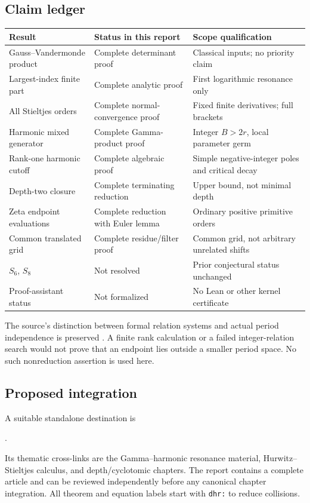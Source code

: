 \documentclass[11pt,letterpaper]{article}
\numberwithin{equation}{section}
\theoremstyle{definition}\newtheorem{definition}[theorem]{Definition}
\theoremstyle{remark}\newtheorem{remark}[theorem]{Remark}
\begin{document}
\subsection{Claim ledger}
\begin{center}
\small
\begin{tabular}{>{\raggedright\arraybackslash}p{}>{\raggedright\arraybackslash}p{}>{\raggedright\arraybackslash}p{}}
\toprule
Result & Status in this report & Scope qualification\\
\midrule
Gauss--Vandermonde product & Complete determinant proof & Classical inputs; no priority claim\\
Largest-index finite part & Complete analytic proof & First logarithmic resonance only\\
All Stieltjes orders & Complete normal-convergence proof & Fixed finite derivatives; full brackets\\
Harmonic mixed generator & Complete Gamma-product proof & Integer $B>2r$, local parameter germ\\
Rank-one harmonic cutoff & Complete algebraic proof & Simple negative-integer poles and critical decay\\
Depth-two closure & Complete terminating reduction & Upper bound, not minimal depth\\
Zeta endpoint evaluations & Complete reduction with Euler lemma & Ordinary positive primitive orders\\
Common translated grid & Complete residue/filter proof & Common grid, not arbitrary unrelated shifts\\
$S_6$, $S_8$ & Not resolved & Prior conjectural status unchanged\\
Proof-assistant status & Not formalized & No Lean or other kernel certificate\\
\bottomrule
\end{tabular}
\end{center}

The source's distinction between formal relation systems and actual
period independence is preserved \cite{repo:quotients}. A finite
rank calculation or a failed integer-relation search would not prove
that an endpoint lies outside a smaller period space. No such
nonreduction assertion is used here.

\subsection{Proposed integration}
A suitable standalone destination is
\begin{center}
\small{}.
\end{center}
Its thematic cross-links are the Gamma--harmonic resonance material,
Hurwitz--Stieltjes calculus, and depth/cyclotomic chapters. The report
contains a complete article and can be reviewed independently before
any canonical chapter integration. All theorem and equation labels
start with \texttt{dhr:} to reduce collisions.
\end{document}
